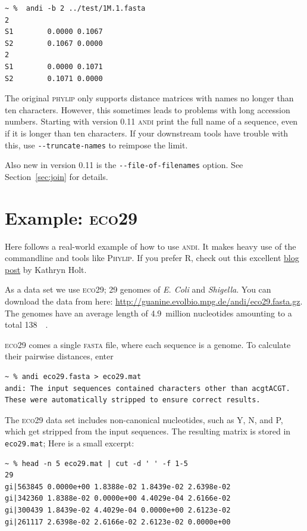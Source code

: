 \documentclass[a4paper,
  10pt,
  english,
  DIV=12,
  BCOR=8mm]{scrbook}
\newcommand{\algo}[1]{\textsc{{#1}}}
\newcommand{\andi}{\algo{andi}\xspace}
\newcommand{\word}[1]{\textsf{\small#1}}
\begin{document}
\begin{lstlisting}
~ %  andi -b 2 ../test/1M.1.fasta
2
S1        0.0000 0.1067
S2        0.1067 0.0000
2
S1        0.0000 0.1071
S2        0.1071 0.0000
\end{lstlisting}

The original \algo{phylip} only supports distance matrices with names no longer than ten characters. However, this sometimes leads to problems with long accession numbers. Starting with version 0.11 \andi print the full name of a sequence, even if it is longer than ten characters. If your downstream tools have trouble with this, use \lstinline$--truncate-names$ to reimpose the limit.

Also new in version 0.11 is the \lstinline$--file-of-filenames$ option. See Section~\ref{sec:join} for details.

\section{Example: \algo{eco29}}

Here follows a real-world example of how to use \algo{andi}. It makes heavy use of the commandline and tools like \algo{Phylip}. If you prefer \algo{R}, check out this excellent \href{http://holtlab.net/2015/05/08/r-code-to-infer-tree-from-andi-output/}{blog post} by Kathryn Holt.

As a data set we use \algo{eco29}; 29 genomes of \textit{E. Coli} and \textit{Shigella}. You can download the data from here: {\small{\url{http://guanine.evolbio.mpg.de/andi/eco29.fasta.gz}}}. The genomes have an average length of 4.9~million nucleotides amounting to a total \SI{138}{\mega\byte}.

\algo{eco29} comes a single \algo{fasta} file, where each sequence is a genome. To calculate their pairwise distances, enter

\begin{lstlisting}
~ % andi eco29.fasta > eco29.mat
andi: The input sequences contained characters other than acgtACGT. These were automatically stripped to ensure correct results.
\end{lstlisting}

\noindent The \algo{eco29} data set includes non-canonical nucleotides, such as \word{Y}, \word{N}, and \word{P}, which get stripped from the input sequences. The resulting matrix is stored in \lstinline$eco29.mat$; Here is a small excerpt:

\begin{lstlisting}
~ % head -n 5 eco29.mat | cut -d ' ' -f 1-5
29
gi|563845 0.0000e+00 1.8388e-02 1.8439e-02 2.6398e-02
gi|342360 1.8388e-02 0.0000e+00 4.4029e-04 2.6166e-02
gi|300439 1.8439e-02 4.4029e-04 0.0000e+00 2.6123e-02
gi|261117 2.6398e-02 2.6166e-02 2.6123e-02 0.0000e+00
\end{lstlisting}
\end{document}
